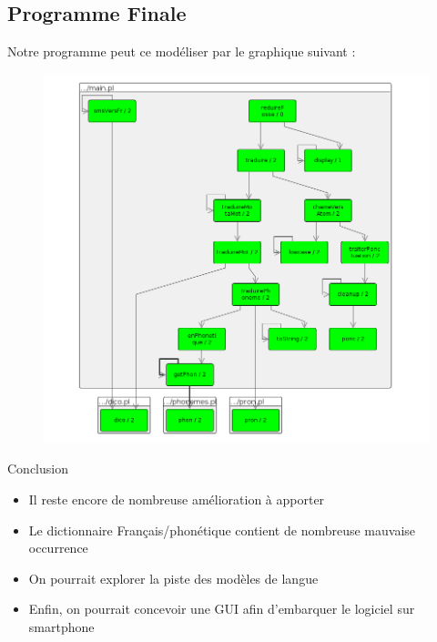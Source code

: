 \documentclass{beamer}
\begin{document}
\subsection{Programme Finale}
\begin{frame}
	Notre programme peut ce modéliser par le graphique suivant :\\
	\begin{figure}[htp]
	\centering
	\includegraphics[scale=0.25]{mainpl.png}
	\end{figure}
\end{frame}

\begin{frame}{Conclusion}
	\begin{itemize}
		\item Il reste encore de nombreuse amélioration à apporter
		\item Le dictionnaire Français/phonétique contient de nombreuse mauvaise occurrence
		\item On pourrait explorer la piste des modèles de langue
		\item Enfin, on pourrait concevoir une GUI afin d'embarquer le logiciel sur smartphone
	\end{itemize}
\end{frame}
\end{document}
